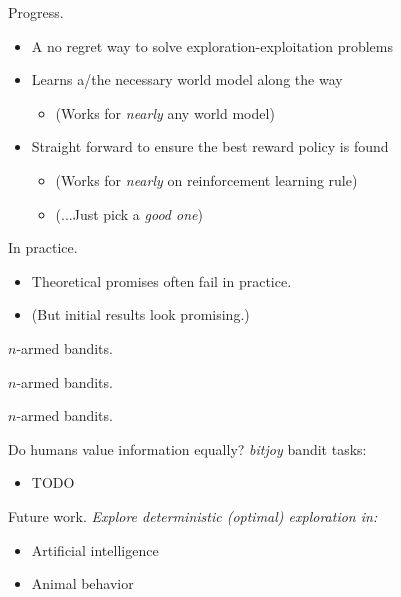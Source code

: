 \documentclass[10pt]{beamer}
\begin{document}
\begin{frame}[fragile]{Progress.}
\begin{itemize}
\item A no regret way to solve exploration-exploitation problems
\item Learns a/the necessary world model along the way
\begin{itemize}
    \item (Works for \textit{nearly} any world model)
\end{itemize}
\item Straight forward to ensure the best reward policy is found
\begin{itemize}
    \item (Works for \textit{nearly} on reinforcement learning rule)
    \item (...Just pick a \textit{good one})
\end{itemize}
\end{itemize}
\end{frame}

\begin{frame}[fragile]{In practice.}
\begin{itemize}
    \item \alert{Theoretical promises often fail in practice.}
    \item (But initial results look promising.)
\end{itemize}
\end{frame}

\begin{frame}[fragile]{$n$-armed bandits.}
\end{frame}

\begin{frame}[fragile]{$n$-armed bandits.}
\end{frame}

\begin{frame}[fragile]{$n$-armed bandits.}
\end{frame}

\begin{frame}[fragile]{Do humans value information equally?}
\textit{bitjoy} bandit tasks:
\begin{itemize}
    \item TODO
\end{itemize}
\end{frame}

\begin{frame}[fragile]{Future work.}
\textit{Explore deterministic (optimal) exploration in:}
\begin{itemize}
    \item Artificial intelligence
    \item Animal behavior
\end{itemize}
\end{frame}
\end{document}
